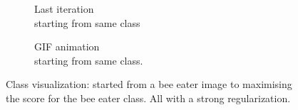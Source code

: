 \begin{figure}[H]
\begin{subfigure}{.33\textwidth}
        \caption{Last iteration\\starting from same class}
        \label{fig:class_viz_start_image:png}
    \end{subfigure}%
    \begin{subfigure}{.33\textwidth}
        \centering
        \caption{GIF animation\\starting from same class.} %
        \label{fig:class_viz_start_image:vid}
    \end{subfigure}

    \caption{Class visualization: started from a bee eater image to maximising the score for the bee eater class. All with a strong regularization.}
    \label{fig:class_viz_start_image}
\end{figure}


